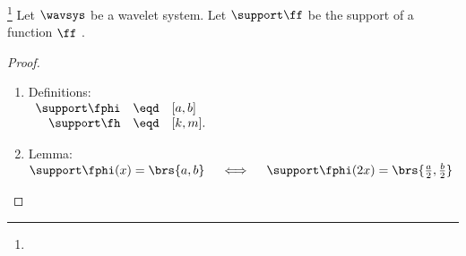 \begin{theorem}
\footnote{
  }
\label{thm:support}
Let $\wavsys$ be a wavelet system.
Let $\support\ff$ be the support of a function $\ff$ .
\thmbox{
  \support\fphi = \support\fh
  }
\end{theorem}
\begin{proof}
\begin{enumerate}

  \item Definitions: \label{item:wavstrct_support_def}
    \\$\begin{array}{rcl}
      \support\fphi &\eqd& [a,b] \\
      \support\fh   &\eqd& [k,m].
     \end{array}$

  \item Lemma: \label{item:wavstrct_support_lemma}
    \\$\support\fphi(x)=\brs{a,b} \quad\iff\quad \support\fphi(2x)=\brs{\frac{a}{2},\frac{b}{2}}$


\end{enumerate}
\end{proof}
